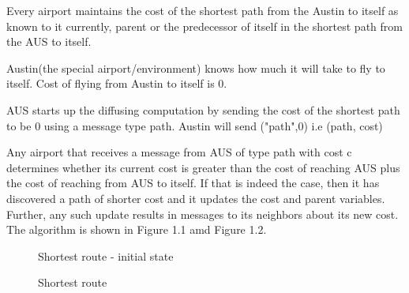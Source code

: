 \documentclass[twoside]{article}
\begin{document}
Every airport maintains the cost of the shortest path from the Austin to itself as known to it currently, parent or the predecessor of itself in the shortest path from the AUS to itself.

Austin(the special airport/environment) knows how much it will take to fly to itself. Cost of flying from Austin to itself is 0.

AUS starts up the diffusing computation by sending the cost of the shortest path to be 0 using a message type path.
Austin will send ("path",0) i.e (path, cost) 

Any airport that receives a message from AUS of type path with cost c determines whether its current cost is greater than the cost of reaching AUS plus the cost of reaching from AUS to itself. If that is indeed the case, then it has discovered a path of shorter cost and it updates the cost and parent variables. Further, any such update results in messages to its neighbors about its new cost. The algorithm is shown in Figure 1.1 amd Figure 1.2. 

\begin{figure}[H]
\centering
{}
\caption{Shortest route - initial state} 
\end{figure}

\begin{figure}[H]
\centering
{}
\caption{Shortest route} 
\end{figure}
\end{document}
